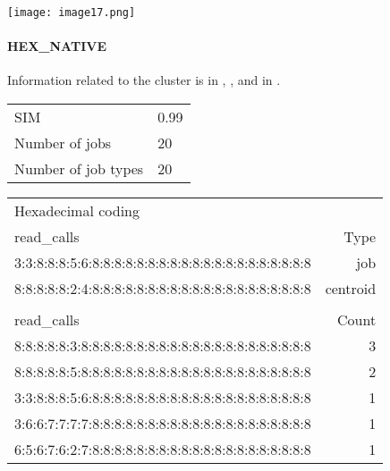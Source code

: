 \documentclass{jhps}
\begin{document}
\begingroup
  \centering
  \texttt{[image: image17.png]}
  \label{fig:use_case:hex_lev:length}
\endgroup

\paragraph{HEX\_NATIVE}
Information related to the cluster is in , , and in .

\begingroup
  \centering
  \begin{tabular}{ll}
    SIM & 0.99 \\
    Number of jobs & 20 \\
    Number of job types & 20 \\
  \end{tabular}
  \label{tab:use_case:hex_native:stats}
\endgroup

\begingroup
  \centering
  \begin{tiny}
    \begin{tabular}{@{ }l@{ }|@{ }r@{ }}
      \rowcolor{tabhcolor}
      Hexadecimal coding & \\
      \rowcolor{tabhcolor}
      read\_calls                                           & Type     \\
      \hline
      3:3:8:8:8:5:6:8:8:8:8:8:8:8:8:8:8:8:8:8:8:8:8:8:8:8:8 & job      \\
      8:8:8:8:8:2:4:8:8:8:8:8:8:8:8:8:8:8:8:8:8:8:8:8:8:8:8 & centroid \\
      \multicolumn{2}{l}{}\\
			\rowcolor{tabhcolor}
      read\_calls                                           & Count    \\
      \hline
      8:8:8:8:8:3:8:8:8:8:8:8:8:8:8:8:8:8:8:8:8:8:8:8:8:8:8 & 3        \\
      8:8:8:8:8:5:8:8:8:8:8:8:8:8:8:8:8:8:8:8:8:8:8:8:8:8:8 & 2        \\
      3:3:8:8:8:5:6:8:8:8:8:8:8:8:8:8:8:8:8:8:8:8:8:8:8:8:8 & 1        \\
      3:6:6:7:7:7:7:8:8:8:8:8:8:8:8:8:8:8:8:8:8:8:8:8:8:8:8 & 1        \\
      6:5:6:7:6:2:7:8:8:8:8:8:8:8:8:8:8:8:8:8:8:8:8:8:8:8:8 & 1        \\
    \end{tabular}
  \end{tiny}
  \label{tab:use_case:hex_native:job_centroid}
\endgroup
\end{document}
